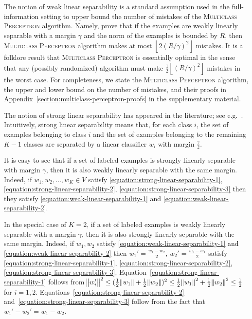 The notion of weak linear separability is a standard assumption used in the
full-information setting to upper bound the number of mistakes of the
\textsc{Multiclass Perceptron} algorithm. Namely, \citet{Crammer-Singer-2003}
prove that if the examples are weakly linearly separable with a margin $\gamma$
and the norm of the examples is bounded by $R$, then \textsc{Multiclass
Perceptron} algorithm makes at most $\left\lfloor 2(R/\gamma)^2 \right \rfloor$
mistakes. It is a folklore result that \textsc{Multiclass Perceptron} is
essentially optimal in the sense that any (possibly randomized) algorithm must
make $\frac{1}{2} \left\lfloor (R/\gamma)^2 \right \rfloor$ mistakes in the
worst case. For completeness, we state the \textsc{Multiclass Perceptron}
algorithm, the upper and lower bound on the number of mistakes, and their proofs
in Appendix~\ref{section:multiclass-perceptron-proofs} in the supplementary
material.

The notion of strong linear separability has appeared in the literature; see
e.g.~\citet{Chen-Chen-Zhang-Chen-Zhang-2009}. Intuitively, strong linear
separability means that, for each class $i$, the set of examples belonging to
class $i$ and the set of examples belonging to the remaining $K-1$ classes are
separated by a linear classifier $w_i$ with margin $\frac{\gamma}{2}$.

It is easy to see that if a set of labeled examples is strongly linearly
separable with margin $\gamma$, then it is also weakly linearly separable with
the same margin. Indeed, if $w_1, w_2, \dots, w_K \in V$ satisfy
\eqref{equation:strong-linear-separability-1},
\eqref{equation:strong-linear-separability-2},
\eqref{equation:strong-linear-separability-3} then they satisfy
\eqref{equation:weak-linear-separability-1} and
\eqref{equation:weak-linear-separability-2}.

In the special case of $K=2$, if a set of labeled examples is weakly
linearly separable with a margin $\gamma$, then it is also strongly linearly
separable with the same margin. Indeed, if $w_1, w_2$ satisfy
\eqref{equation:weak-linear-separability-1} and
\eqref{equation:weak-linear-separability-2} then $w_1' = \frac{w_1 - w_2}{2}$,
$w_2' = \frac{w_2 - w_1}{2}$ satisfy
\eqref{equation:strong-linear-separability-1},
\eqref{equation:strong-linear-separability-2},
\eqref{equation:strong-linear-separability-3}.
Equation~\eqref{equation:strong-linear-separability-1} follows from
$\norm{w_i'}^2 \le (\frac{1}{2} \norm{w_1} + \frac{1}{2} \norm{w_2})^2 \le
\frac{1}{2}\norm{w_1}^2 + \frac{1}{2}\norm{w_2}^2 \le \frac{1}{2}$ for $i=1,2$.
Equations~\eqref{equation:strong-linear-separability-2}
and~\eqref{equation:strong-linear-separability-3} follow from the fact that
$w_1' - w_2' = w_1 - w_2$.


